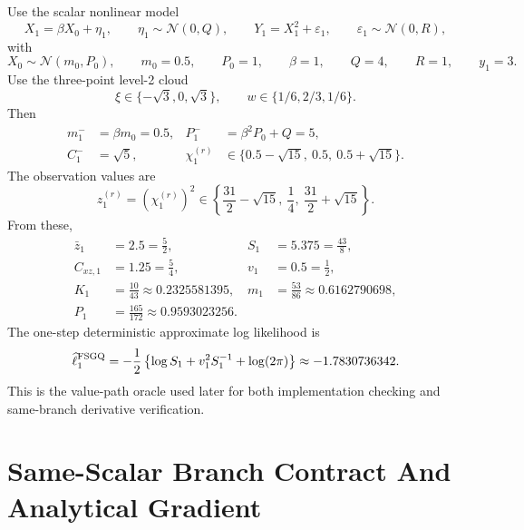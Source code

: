 \documentclass[11pt]{article}
\numberwithin{equation}{section}
\newcommand{\N}{\mathcal N}
\newcommand{\ellhat}{\widehat\ell}
\begin{document}
Use the scalar nonlinear model
\begin{equation}
  X_1 = \beta X_0 + \eta_1,
  \qquad
  \eta_1\sim\N(0,Q),
  \qquad
  Y_1 = X_1^2 + \varepsilon_1,
  \qquad
  \varepsilon_1\sim\N(0,R),
  \label{eq:p32-example-model}
\end{equation}
with
\begin{equation}
  X_0\sim\N(m_0,P_0),
  \qquad
  m_0=0.5,
  \qquad
  P_0=1,
  \qquad
  \beta=1,
  \qquad
  Q=4,
  \qquad
  R=1,
  \qquad
  y_1=3.
  \label{eq:p32-example-params}
\end{equation}
Use the three-point level-2 cloud
\[
  \xi\in\{-\sqrt3,0,\sqrt3\},
  \qquad
  w\in\{1/6,2/3,1/6\}.
\]
Then
\begin{align}
  m_1^- &= \beta m_0 = 0.5,
  &P_1^- &= \beta^2P_0+Q = 5,\\
  C_1^- &= \sqrt5,
  &\chi_1^{(r)} &\in \{0.5-\sqrt{15},\ 0.5,\ 0.5+\sqrt{15}\}.
\end{align}
The observation values are
\begin{equation}
  z_1^{(r)} = (\chi_1^{(r)})^2
  \in
  \left\{\frac{31}{2}-\sqrt{15},\ \frac14,\ \frac{31}{2}+\sqrt{15}\right\}.
  \label{eq:p32-example-z-values}
\end{equation}
From these,
\begin{align}
  \bar z_1&=2.5=\frac52,
  &S_1&=5.375=\frac{43}{8},\\
  C_{xz,1}&=1.25=\frac54,
  &v_1&=0.5=\frac12,\\
  K_1&=\frac{10}{43}\approx 0.2325581395,
  &m_1&=\frac{53}{86}\approx0.6162790698,\\
  P_1&=\frac{165}{172}\approx0.9593023256.
  \label{eq:p32-example-moments}
\end{align}
The one-step deterministic approximate log likelihood is
\begin{equation}
  \ellhat_1^{\rm FSGQ}
  =
  -\frac12\left\{\log S_1+v_1^2S_1^{-1}+\log(2\pi)\right\}
  \approx -1.7830736342.
  \label{eq:p32-example-ell}
\end{equation}
This is the value-path oracle used later for both implementation checking and
same-branch derivative verification.

\section{Same-Scalar Branch Contract And Analytical Gradient}
\label{sec:p31-same-scalar}
\end{document}
